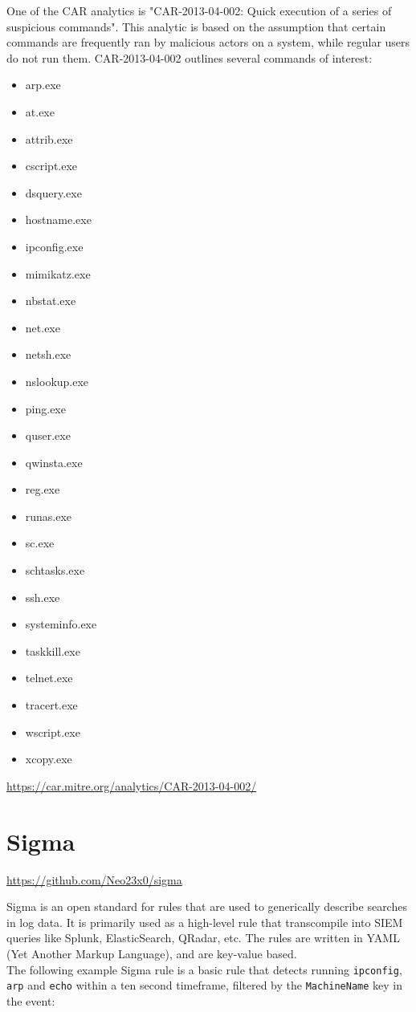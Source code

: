 One of the CAR analytics is "CAR-2013-04-002: Quick execution of a series of suspicious commands". This analytic is based on the assumption that certain commands are frequently ran by malicious actors on a system, while regular users do not run them. CAR-2013-04-002 outlines several commands of interest:
\begin{multicols}{2}
\begin{itemize}
\item arp.exe
\item at.exe
\item attrib.exe
\item cscript.exe
\item dsquery.exe
\item hostname.exe
\item ipconfig.exe
\item mimikatz.exe
\item nbstat.exe
\item net.exe
\item netsh.exe
\item nslookup.exe
\item ping.exe
\item quser.exe
\item qwinsta.exe
\item reg.exe
\item runas.exe
\item sc.exe
\item schtasks.exe
\item ssh.exe
\item systeminfo.exe
\item taskkill.exe
\item telnet.exe
\item tracert.exe
\item wscript.exe
\item xcopy.exe
\end{itemize}
\end{multicols}
\url{https://car.mitre.org/analytics/CAR-2013-04-002/}



\section{Sigma}
\url{https://github.com/Neo23x0/sigma}

Sigma is an open standard for rules that are used to generically describe searches in log data. It is primarily used as a high-level rule that transcompile into SIEM queries like Splunk, ElasticSearch, QRadar, etc. The rules are written in YAML (Yet Another Markup Language), and are key-value based.
\\
The following example Sigma rule is a basic rule that detects running \lstinline{ipconfig}, \lstinline{arp} and \lstinline{echo} within a ten second timeframe, filtered by the \lstinline{MachineName} key in the event: 

